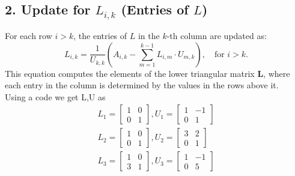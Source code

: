 \documentclass{beamer}
\theoremstyle{remark}
\numberwithin{equation}{section}
\begin{document}
\begin{frame}[fragile]
    \subsection*{2. Update for $ L_{i,k} $ (Entries of $ L $)}

For each row $ i > k $, the entries of $ L $ in the $ k $-th column are updated as:
\[
L_{i,k} = \frac{1}{U_{k,k}} \left( A_{i,k} - \sum_{m=1}^{k-1} L_{i,m} \cdot U_{m,k} \right), \quad \text{for } i > k.
\]
This equation computes the elements of the lower triangular matrix $ \mathbf{L} $, where each entry in the column is determined by the values in the rows above it.\\
Using a code we get L,U as 
\begin{align}   
L_1 = \begin{bmatrix} 1 & 0 \\ 0 & 1 \end{bmatrix},
U_1 = \begin{bmatrix} 1 & -1 \\ 0 & 1 \end{bmatrix}\\
L_2 = \begin{bmatrix} 1 & 0 \\ 0 & 1 \end{bmatrix},
U_2 = \begin{bmatrix} 3 & 2 \\ 0 & 1 \end{bmatrix}\\
L_3 = \begin{bmatrix} 1 & 0 \\ 3 & 1 \end{bmatrix},
U_3 = \begin{bmatrix} 1 & -1 \\ 0 & 5 \end{bmatrix}
\end{align}
\end{frame}
\end{document}
